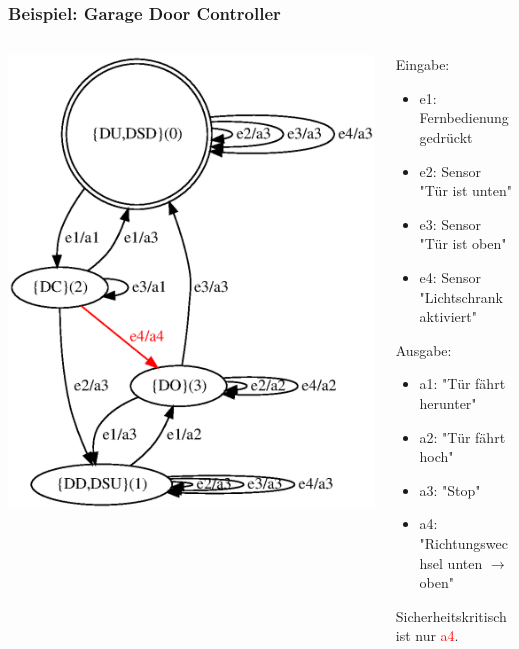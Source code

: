     \begin{frame}
    \frametitle{Beispiel: Garage Door Controller}
    \begin{columns}[T] %
    \begin{column}{.55\textwidth}
    
    \includegraphics[width=\textwidth]{images/gdc_min_colored}
    \end{column}%
    \hfill%
    \begin{column}{.55\textwidth}
    Eingabe:
    \begin{itemize}
      \item e1: Fernbedienung gedrückt
      \item e2: Sensor "Tür ist unten"
      \item e3: Sensor "Tür ist oben"
      \item e4: Sensor "Lichtschrank aktiviert"
    \end{itemize}
    Ausgabe:
    \begin{itemize}
      \item a1: "Tür fährt herunter"
      \item a2: "Tür fährt hoch"
      \item a3: "Stop"
      \item a4: "Richtungswechsel unten $\rightarrow$ oben"
    \end{itemize}
    Sicherheitskritisch ist nur \textcolor{red}{a4}.
    \end{column}%
    \end{columns}
    \end{frame}
    
